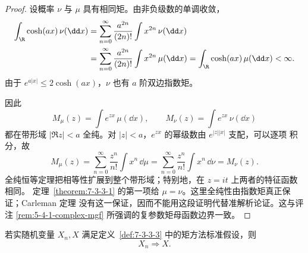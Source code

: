 \begin{proof}
设概率 $\nu$ 与 $\mu$ 具有相同矩。由非负级数的单调收敛，
\begin{align*}
 \int_\R\cosh(ax)\,\nu(\dd x)
 &=\sum_{n=0}^\infty\frac{a^{2n}}{(2n)!}
   \int x^{2n}\,\nu(\dd x)\\
 &=\sum_{n=0}^\infty\frac{a^{2n}}{(2n)!}
   \int x^{2n}\,\mu(\dd x)
 =\int_\R\cosh(ax)\,\mu(\dd x)<\infty.
\end{align*}
由于 $e^{a|x|}\leq2\cosh(ax)$，$\nu$ 也有 $a$ 阶双边指数矩。

因此
\[
 M_\mu(z)=\int e^{zx}\,\mu(\dd x),
 \qquad
 M_\nu(z)=\int e^{zx}\,\nu(\dd x)
\]
都在带形域 $|\Re z|<a$ 全纯。对 $|z|<a$，$e^{zx}$ 的幂级数由 $e^{|z||x|}$ 支配，可以逐项
积分，故
\[
 M_\mu(z)=\sum_{n=0}^\infty\frac{z^n}{n!}\int x^n\,\dd\mu
 =\sum_{n=0}^\infty\frac{z^n}{n!}\int x^n\,\dd\nu=M_\nu(z).
\]
全纯恒等定理把相等性扩展到整个带形域；特别地，在 $z=it$ 上两者的特征函数相同。
定理~\ref{theorem:7-3-3-1} 的第一项给 $\mu=\nu$。这里全纯性由指数矩真正保证；Carleman 定理
没有这一保证，因而不能用这段证明代替准解析论证。这与评注
\ref{rem:5-4-1-complex-mgf} 所强调的复参数矩母函数边界一致。
\end{proof}

\begin{theorem}[矩方法的收敛定理]\label{theorem:7-3-3-4}
若实随机变量 $X_n,X$ 满足定义~\ref{def:7-3-3-3} 中的矩方法标准假设，则
\[
 X_n\Rightarrow X.
\]
\end{theorem}

